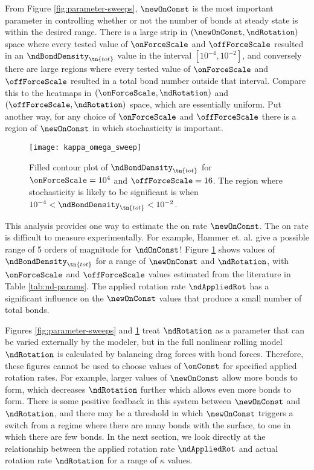 From Figure \ref{fig:parameter-sweeps}, $\newOnConst$ is the most
important parameter in controlling whether or not the number of bonds
at steady state is within the desired range. There is a large strip in
$(\newOnConst, \ndRotation)$ space where every tested value of
$\onForceScale$ and $\offForceScale$ resulted in an
$\ndBondDensity_\tn{tot}$ value in the interval $[10^{-4}, 10^{-2}]$,
and conversely there are large regions where every tested value of
$\onForceScale$ and $\offForceScale$ resulted in a total bond number
outside that interval. Compare this to the heatmaps in
$(\onForceScale, \ndRotation)$ and $(\offForceScale, \ndRotation)$
space, which are essentially uniform. Put another way, for any choice
of $\onForceScale$ and $\offForceScale$ there is a region of
$\newOnConst$ in which stochasticity is important.

\begin{figure}
  \centering
  \texttt{[image: kappa\_omega\_sweep]}
  \caption[Filled contour plot of $\ndBondDensity_\tn{tot}$ for
  $\onForceScale = 10^4$ and $\offForceScale = 16$.]{Filled contour
    plot of $\ndBondDensity_\tn{tot}$ for $\onForceScale = 10^4$ and
    $\offForceScale = 16$. The region where stochasticity is likely to
    be significant is when
    $10^{-4} < \ndBondDensity_\tn{tot} < 10^{-2}$.}
  \label{fig:kappa-omega-sweep}
\end{figure}

This analysis provides one way to estimate the on rate
$\newOnConst$. The on rate is difficult to measure experimentally. For
example, Hammer et. al. \cite{Hammer1992a} give a possible range of 5
orders of magnitude for $\ndOnConst$! Figure
\ref{fig:kappa-omega-sweep} shows values of $\ndBondDensity_\tn{tot}$
for a range of $\newOnConst$ and $\ndRotation$, with $\onForceScale$
and $\offForceScale$ values estimated from the literature in Table
\ref{tab:nd-params}. The applied rotation rate $\ndAppliedRot$ has a
significant influence on the $\newOnConst$ values that produce a small
number of total bonds. 

Figures \ref{fig:parameter-sweeps} and \ref{fig:kappa-omega-sweep}
treat $\ndRotation$ as a parameter that can be varied externally by
the modeler, but in the full nonlinear rolling model $\ndRotation$ is
calculated by balancing drag forces with bond forces. Therefore, these
figures cannot be used to choose values of $\onConst$ for specified
applied rotation rates. For example, larger values of $\newOnConst$
allow more bonds to form, which decreases $\ndRotation$ further which
allows even more bonds to form. There is some positive feedback in
this system between $\newOnConst$ and $\ndRotation$, and there may be
a threshold in which $\newOnConst$ triggers a switch from a regime
where there are many bonds with the surface, to one in which there are
few bonds. In the next section, we look directly at the relationship
between the applied rotation rate $\ndAppliedRot$ and actual rotation
rate $\ndRotation$ for a range of $\kappa$ values.

